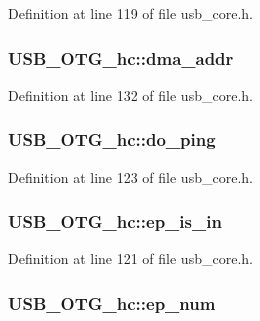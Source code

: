 Definition at line 119 of file usb\-\_\-core.\-h.

\hypertarget{struct_u_s_b___o_t_g__hc_a2ba984cead476ce16f712b6a860ce556}{
\subsubsection[{dma\-\_\-addr}]{ U\-S\-B\-\_\-\-O\-T\-G\-\_\-hc\-::dma\-\_\-addr}}\label{struct_u_s_b___o_t_g__hc_a2ba984cead476ce16f712b6a860ce556}


Definition at line 132 of file usb\-\_\-core.\-h.

\hypertarget{struct_u_s_b___o_t_g__hc_ad404179e19cea6269c20dd36e1104ea2}{
\subsubsection[{do\-\_\-ping}]{ U\-S\-B\-\_\-\-O\-T\-G\-\_\-hc\-::do\-\_\-ping}}\label{struct_u_s_b___o_t_g__hc_ad404179e19cea6269c20dd36e1104ea2}


Definition at line 123 of file usb\-\_\-core.\-h.

\hypertarget{struct_u_s_b___o_t_g__hc_abb0b4bdda4af97072940e872ac6b5aec}{
\subsubsection[{ep\-\_\-is\-\_\-in}]{ U\-S\-B\-\_\-\-O\-T\-G\-\_\-hc\-::ep\-\_\-is\-\_\-in}}\label{struct_u_s_b___o_t_g__hc_abb0b4bdda4af97072940e872ac6b5aec}


Definition at line 121 of file usb\-\_\-core.\-h.

\hypertarget{struct_u_s_b___o_t_g__hc_add7d3bb441522a25b7f1f30329166991}{
\subsubsection[{ep\-\_\-num}]{ U\-S\-B\-\_\-\-O\-T\-G\-\_\-hc\-::ep\-\_\-num}}\label{struct_u_s_b___o_t_g__hc_add7d3bb441522a25b7f1f30329166991}


